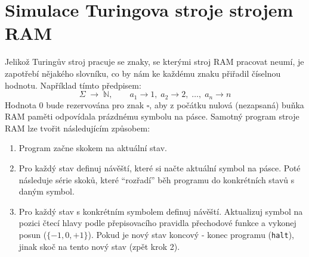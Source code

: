 \section{Simulace Turingova stroje strojem RAM}
Jelikož Turingův stroj pracuje se znaky, se kterými stroj RAM pracovat neumí, je zapotřebí nějakého slovníku, 
co by nám ke každému znaku přiřadil číselnou hodnotu. Například tímto předpisem:
\[
  \Sigma \;\longrightarrow\; \mathbb{N},\qquad 
  a_1 \rightarrow 1,\; a_2 \rightarrow 2,\;\dots,\; a_n \rightarrow n
\]
Hodnota 0 bude rezervována pro znak $\square$, aby z počátku nulová (nezapsaná) buňka RAM paměti odpovídala prázdnému symbolu na pásce.
Samotný program stroje RAM lze tvořit následujícím způsobem:
\begin{enumerate}
	\item Program začne skokem na aktuální stav.
	\item Pro každý stav definuj návěští, které si načte aktuální symbol na pásce. 
		Poté následuje série skoků, které \enquote{rozřadí} běh programu do konkrétních stavů s daným symbol.
	\item Pro každý stav s konkrétním symbolem definuj návěští. Aktualizuj symbol na pozici čtecí hlavy podle přepisovacího pravidla přechodové funkce a vykonej posun ($\{-1, 0, +1\}$). 
		Pokud je nový stav koncový - konec programu (\texttt{halt}), jinak skoč na tento nový stav (zpět krok 2).
\end{enumerate}